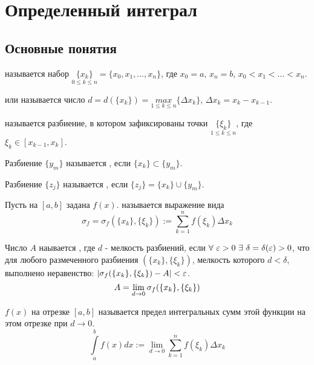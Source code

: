 \chapter{Определенный интеграл}
\section{Основные понятия}
\begin{opred}
 называется набор $\underset{0\leq k\leq n}{\{x_k\}}=\{x_0,x_1,\ldots,x_n\}$, где $x_0=a$, $x_n=b$, $x_0<x_1<\ldots<x_n$.
\end{opred}
\begin{opred}
 или  называется число $d=d(\{x_k\})=\underset{1\leq k\leq n}{max}\{\Delta x_k\}$, $\Delta x_k=x_k-x_{k-1}$.
\end{opred}
\begin{opred}
 называется разбиение, в котором зафиксированы точки $\underset{1\leq k\leq n}{\{\xi_k\}}$, где $\xi_k\in[x_{k-1},x_k]$.
\end{opred}
\begin{opred}
Разбиение $\{y_m\}$ называется , если $\{x_k\}\subset\{y_m\}$.
\end{opred}
\begin{opred}
Разбиение $\{z_j\}$ называется , если $\{z_j\}=\{x_k\}\cup\{y_m\}$.
\end{opred}
\begin{opred}
Пусть на $[a,b]$ задана $f(x)$.  называется выражение вида $$\sigma_f=\sigma_f(\{x_k\},\{\xi_k\}):=\sum\limits^n_{k=1}f(\xi_k)\Delta x_k$$
\end{opred}
\begin{opred}
Число $A$ наывается , где $d$ - мелкость разбиений, если $\forall\ \eps>0\ \exists\ \delta=\delta(\eps)>0$, что для любого размеченного разбиения $(\{x_k\},\{\xi_k\})$, мелкость которого $d<\delta$, выполнено неравенство: $|\sigma_f(\{x_k\},\{\xi_k\})-A|<\varepsilon$.
$$A=\lim\limits_{d\to0}\sigma_f(\{x_k\},\{\xi_k\})$$
\end{opred}
\begin{opred}
 $f(x)$ на отрезке $[a,b]$ называется предел интегральных сумм этой функции на этом отрезке при $d\to0$.
$$\int\limits^b_af(x)dx:=\lim\limits_{d\to0}\sum\limits^n_{k=1}f(\xi_k)\Delta x_k$$
\end{opred}
